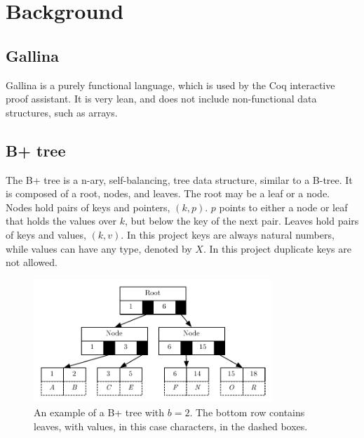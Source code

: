 \section{Background}
\label{sec:Background}

\subsection{Gallina}
Gallina is a purely functional language, which is used by the Coq interactive proof assistant. It is very lean, and does not include non-functional data structures, such as arrays.

\subsection{B+ tree}
The B+ tree is a n-ary, self-balancing, tree data structure, similar to a B-tree. It is composed of a root, nodes, and leaves. The root may be a leaf or a node. Nodes hold pairs of keys and pointers, $(k, p)$. $p$ points to either a node or leaf that holds the values over $k$, but below the key of the next pair. Leaves hold pairs of keys and values, $(k, v)$. In this project keys are always natural numbers, while values can have any type, denoted by $X$. In this project duplicate keys are not allowed.

\begin{figure}
 \centering
   \includegraphics[width=90mm]{diagrams/BPlusTree.pdf}
 \caption{An example of a B+ tree with $b=2$. The bottom row contains leaves, with values, in this case characters, in the dashed boxes.}
 \label{fig:bplustree}
\end{figure}

